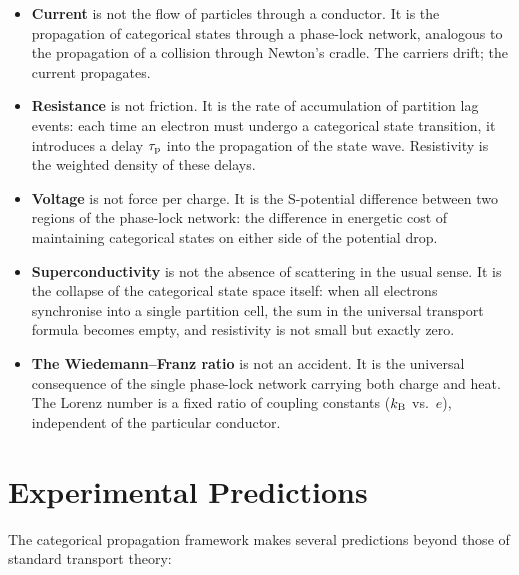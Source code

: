 \begin{itemize}
  \item \textbf{Current} is not the flow of particles through a conductor.
    It is the propagation of categorical states through a phase-lock network,
    analogous to the propagation of a collision through Newton's cradle.
    The carriers drift; the current propagates.

  \item \textbf{Resistance} is not friction.  It is the rate of accumulation
    of partition lag events: each time an electron must undergo a categorical
    state transition, it introduces a delay $\tau_{\mathrm{p}}$ into the propagation
    of the state wave.  Resistivity is the weighted density of these delays.

  \item \textbf{Voltage} is not force per charge.  It is the S-potential
    difference between two regions of the phase-lock network: the difference
    in energetic cost of maintaining categorical states on either side of the
    potential drop.

  \item \textbf{Superconductivity} is not the absence of scattering in the
    usual sense.  It is the collapse of the categorical state space itself:
    when all electrons synchronise into a single partition cell, the sum in
    the universal transport formula becomes empty, and resistivity is not
    small but exactly zero.

  \item \textbf{The Wiedemann--Franz ratio} is not an accident.  It is the
    universal consequence of the single phase-lock network carrying both
    charge and heat.  The Lorenz number is a fixed ratio of coupling
    constants ($k_{\mathrm{B}}$ vs.\ $e$), independent of the particular conductor.
\end{itemize}

\section{Experimental Predictions}
\label{sec:ch18-predictions}

The categorical propagation framework makes several predictions beyond
those of standard transport theory:

